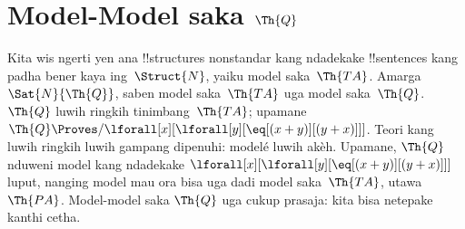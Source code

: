 \documentclass[../../../include/open-logic-section]{subfiles}
\begin{document}
\section{Model-Model saka $\Th{Q}$}

\begin{explain}
Kita wis ngerti yen ana
!!{structure}s nonstandar kang
ndadekake !!{sentence}s kang padha
bener kaya ing~$\Struct{N}$,
yaiku model saka~$\Th{TA}$.
Amarga $\Sat{N}{\Th{Q}}$,
saben model saka~$\Th{TA}$
uga model saka~$\Th{Q}$.
$\Th{Q}$ luwih ringkih
tinimbang~$\Th{TA}$;
upamane
$\Th{Q} \Proves/ \lforall[x][\lforall[y][\eq[(x +
      y)][(y+x)]]]$.
Teori kang luwih ringkih
luwih gampang dipenuhi:
modelé luwih akèh.
Upamane, $\Th{Q}$
nduweni model kang ndadekake
$\lforall[x][\lforall[y][\eq[(x + y)][(y+x)]]]$
luput, nanging model mau
ora bisa uga dadi model
saka~$\Th{TA}$, utawa
$\Th{PA}$.
Model-model saka $\Th{Q}$
uga cukup prasaja:
kita bisa netepake
kanthi cetha.
\end{explain}
\end{document}
